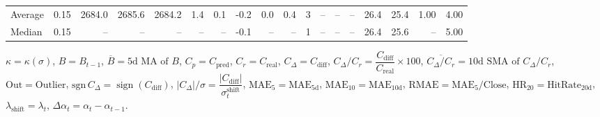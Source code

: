 \begin{threeparttable}
{\begin{tabular}{lrrrrrrrrrrrrrrrrr}
Average &     0.15 & 2684.0 & 2685.6 & 2684.2 &        1.4 &            0.1 &                      -0.2 &                      0.0 &                 0.4 &              3 &         -- &        -- &             -- &             26.4 &                25.4 &            1.00 &                   4.00 \\
 Median &     0.15 &     -- &     -- &     -- &         -- &             -- &                      -0.1 &                       -- &                  -- &              1 &         -- &        -- &             -- &             26.4 &                25.6 &              -- &                   5.00 \\
\bottomrule
\end{tabular}
}
\begin{tablenotes}\footnotesize
\item $\kappa=\kappa(\sigma)$, $B=B_{t-1}$, $\overline{B}=\text{5d MA of }B$, $C_p=C_{\text{pred}}$, $C_r=C_{\text{real}}$, $C_\Delta=C_{\text{diff}}$, $C_\Delta/C_r=\dfrac{C_{\text{diff}}}{C_{\text{real}}}\times100$, $\overline{C_\Delta/C_r}=\text{10d SMA of }C_\Delta/C_r$, $\mathrm{Out}=\text{Outlier}$, $\mathrm{sgn}\,C_\Delta=\operatorname{sign}(C_{\text{diff}})$, $|C_\Delta|/\sigma=\dfrac{|C_{\text{diff}}|}{\sigma_t^{\text{shift}}}$, $\mathrm{MAE}_5=\mathrm{MAE}_{5\text{d}}$, $\mathrm{MAE}_{10}=\mathrm{MAE}_{10\text{d}}$, $\mathrm{RMAE}= \mathrm{MAE}_5 / \text{Close}$, $\mathrm{HR}_{20}=\mathrm{HitRate}_{20\text{d}}$, $\lambda_{\text{shift}}=\lambda_t$, $\Delta\alpha_t=\alpha_t-\alpha_{t-1}$.
\end{tablenotes}
\end{threeparttable}
\endgroup

